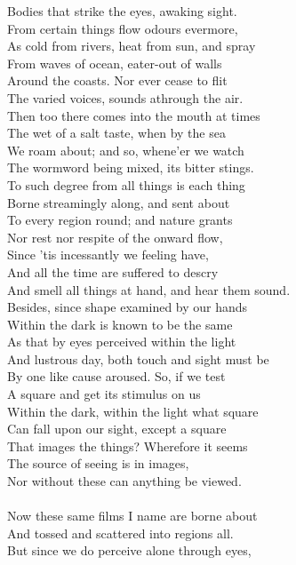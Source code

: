 Bodies that strike the eyes, awaking sight.\\
From certain things flow odours evermore,\\
As cold from rivers, heat from sun, and spray\\
From waves of ocean, eater-out of walls\\
Around the coasts. Nor ever cease to flit\\
The varied voices, sounds athrough the air.\\
Then too there comes into the mouth at times\\
The wet of a salt taste, when by the sea\\
We roam about; and so, whene'er we watch\\
The wormword being mixed, its bitter stings.\\
To such degree from all things is each thing\\
Borne streamingly along, and sent about\\
To every region round; and nature grants\\
Nor rest nor respite of the onward flow,\\
Since 'tis incessantly we feeling have,\\
And all the time are suffered to descry\\
And smell all things at hand, and hear them sound.\\
Besides, since shape examined by our hands\\
Within the dark is known to be the same\\
As that by eyes perceived within the light\\
And lustrous day, both touch and sight must be\\
By one like cause aroused. So, if we test\\
A square and get its stimulus on us\\
Within the dark, within the light what square\\
Can fall upon our sight, except a square\\
That images the things? Wherefore it seems\\
The source of seeing is in images,\\
Nor without these can anything be viewed.\\
\\
Now these same films I name are borne about\\
And tossed and scattered into regions all.\\
But since we do perceive alone through eyes,\\
